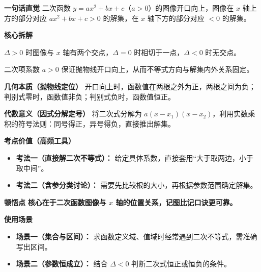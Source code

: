 \begin{explanationbox}
	\textbf{\textcolor{CExplanation}{一句话直觉}}
	二次函数 $y=ax^2+bx+c$（$a>0$）的图像开口向上，图像在 $x$ 轴上方的部分对应 $ax^2+bx+c>0$ 的解集，在 $x$ 轴下方的部分对应 $<0$ 的解集。

	\medskip
	\textbf{\textcolor{CExplanation}{核心拆解}}
	\begin{description}[style=nextline, leftmargin=2.8em, labelsep=0.5em, itemsep=0.45em]
		\item[\textbf{要点一（判别式决定交点）：}]
			$\Delta>0$ 时图像与 $x$ 轴有两个交点，$\Delta=0$ 时相切于一点，$\Delta<0$ 时无交点。
		\item[\textbf{要点二（系数符号定向）：}]
			二次项系数 $a>0$ 保证抛物线开口向上，从而不等式方向与解集内外关系固定。
	\end{description}

	\medskip
	\textbf{\textcolor{CExplanation}{几何本质（抛物线定位）}}
	开口向上时，函数值在两根之外为正，两根之间为负；判别式零时，函数值非负；判别式负时，函数值恒正。

	\medskip
	\textbf{\textcolor{CExplanation}{代数意义（因式分解定号）}}
	将二次式分解为 $a(x-x_1)(x-x_2)$，利用实数乘积的符号法则：同号得正，异号得负，直接推出解集。

	\medskip
	\textbf{\textcolor{CExplanation}{考点价值（高频工具）}}
	\begin{itemize}[leftmargin=*, itemsep=0.5em, topsep=0.4em]
		\item \textbf{考法一（直接解二次不等式）：} 给定具体系数，直接套用“大于取两边，小于取中间”。
		\item \textbf{考法二（含参分类讨论）：} 需要先比较根的大小，再根据参数范围确定解集。
	\end{itemize}

	\medskip
	\textbf{\textcolor{CExplanation}{顿悟点}}
	\textbf{核心在于二次函数图像与 $x$ 轴的位置关系，记图比记口诀更可靠。}

	\medskip
	\textbf{\textcolor{CExplanation}{使用场景}}
	\begin{itemize}[leftmargin=*, itemsep=0.5em, topsep=0.4em]
		\item \textbf{场景一（集合与区间）：} 求函数定义域、值域时经常遇到二次不等式，需准确写出区间。
		\item \textbf{场景二（参数恒成立）：} 结合 $\Delta<0$ 判断二次式恒正或恒负的条件。
	\end{itemize}

\end{explanationbox}
